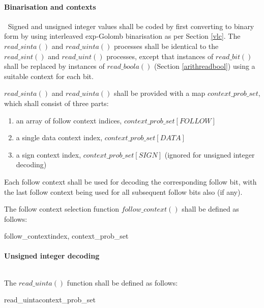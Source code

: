 \paragraph{Binarisation and contexts}\label{binandcontext}
$\ $\newline
Signed and unsigned integer values shall be coded by first converting to binary form by 
using interleaved exp-Golomb binarisation as per Section \ref{vlc}. The 
$read\_sinta()$ and $read\_uinta()$ processes shall be identical to the 
$read\_sint()$ and $read\_uint()$ processes, except that instances of $read\_bit()$ shall be replaced
by instances of $read\_boola()$ (Section \ref{arithreadbool}) using a suitable context
for each bit. 

$read\_sinta()$ and $read\_uinta()$ shall be provided with a map $context\_prob\_set$,
which shall consist of three parts:
\begin{enumerate}
\item an array of follow context indices, $context\_prob\_set[FOLLOW]$
\item a single data context index, $context\_prob\_set[DATA]$ 
\item a sign context index, $context\_prob\_set[SIGN]$ (ignored for unsigned integer decoding)
\end{enumerate}

Each follow context shall be used for decoding the corresponding follow bit, with the
last follow context being used for all subsequent follow bits also (if any).
 
The follow context selection function $follow\_context()$ shall be defined as follows:

\begin{pseudo}{follow\_context}{index, context\_prob\_set}
\end{pseudo}

\paragraph{Unsigned integer decoding}
$\ $\newline

The $read\_uinta()$ function shall be defined as follows:

\begin{pseudo}{read\_uinta}{context\_prob\_set}
  \bsEND
\bsEND
{}
\end{pseudo}

